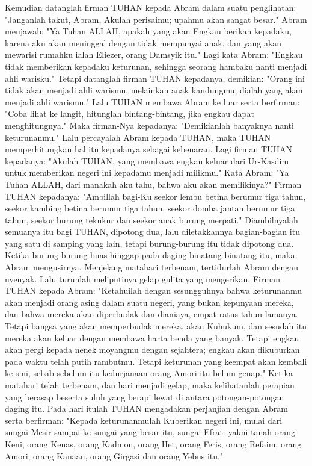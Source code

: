 \begin{biblechapter} %
 Kemudian datanglah firman TUHAN kepada Abram dalam suatu penglihatan: "Janganlah takut, Abram, Akulah perisaimu; upahmu akan sangat besar."
\verse Abram menjawab: "Ya Tuhan ALLAH, apakah yang akan Engkau berikan kepadaku, karena aku akan meninggal dengan tidak mempunyai anak, dan yang akan mewarisi rumahku ialah Eliezer, orang Damsyik itu."
\verse Lagi kata Abram: "Engkau tidak memberikan kepadaku keturunan, sehingga seorang hambaku nanti menjadi ahli warisku."
\verse Tetapi datanglah firman TUHAN kepadanya, demikian: "Orang ini tidak akan menjadi ahli warismu, melainkan anak kandungmu, dialah yang akan menjadi ahli warismu."
\verse Lalu TUHAN membawa Abram ke luar serta berfirman: "Coba lihat ke langit, hitunglah bintang-bintang, jika engkau dapat menghitungnya." Maka firman-Nya kepadanya: "Demikianlah banyaknya nanti keturunanmu."
\verse Lalu percayalah Abram kepada TUHAN, maka TUHAN memperhitungkan hal itu kepadanya sebagai kebenaran.
\verse Lagi firman TUHAN kepadanya: "Akulah TUHAN, yang membawa engkau keluar dari Ur-Kasdim untuk memberikan negeri ini kepadamu menjadi milikmu."
\verse Kata Abram: "Ya Tuhan ALLAH, dari manakah aku tahu, bahwa aku akan memilikinya?"
\verse Firman TUHAN kepadanya: "Ambillah bagi-Ku seekor lembu betina berumur tiga tahun, seekor kambing betina berumur tiga tahun, seekor domba jantan berumur tiga tahun, seekor burung tekukur dan seekor anak burung merpati."
\verse Diambilnyalah semuanya itu bagi TUHAN, dipotong dua, lalu diletakkannya bagian-bagian itu yang satu di samping yang lain, tetapi burung-burung itu tidak dipotong dua.
\verse Ketika burung-burung buas hinggap pada daging binatang-binatang itu, maka Abram mengusirnya.
\verse Menjelang matahari terbenam, tertidurlah Abram dengan nyenyak. Lalu turunlah meliputinya gelap gulita yang mengerikan.
\verse Firman TUHAN kepada Abram: "Ketahuilah dengan sesungguhnya bahwa keturunanmu akan menjadi orang asing dalam suatu negeri, yang bukan kepunyaan mereka, dan bahwa mereka akan diperbudak dan dianiaya, empat ratus tahun lamanya.
\verse Tetapi bangsa yang akan memperbudak mereka, akan Kuhukum, dan sesudah itu mereka akan keluar dengan membawa harta benda yang banyak.
\verse Tetapi engkau akan pergi kepada nenek moyangmu dengan sejahtera; engkau akan dikuburkan pada waktu telah putih rambutmu.
\verse Tetapi keturunan yang keempat akan kembali ke sini, sebab sebelum itu kedurjanaan orang Amori itu belum genap."
\verse Ketika matahari telah terbenam, dan hari menjadi gelap, maka kelihatanlah perapian yang berasap beserta suluh yang berapi lewat di antara potongan-potongan daging itu.
\verse Pada hari itulah TUHAN mengadakan perjanjian dengan Abram serta berfirman: "Kepada keturunanmulah Kuberikan negeri ini, mulai dari sungai Mesir sampai ke sungai yang besar itu, sungai Efrat:
\verse yakni tanah orang Keni, orang Kenas, orang Kadmon,
\verse orang Het, orang Feris, orang Refaim,
\verse orang Amori, orang Kanaan, orang Girgasi dan orang Yebus itu."
\end{biblechapter}

